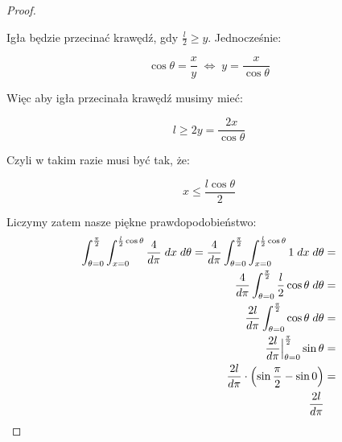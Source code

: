 \begin{proof}
\begin{center}
    \end{center}
    
    Igła będzie przecinać krawędź, gdy \( \frac{l}{2} \geq y\). Jednocześnie:
    
    \[
        \cos{\theta} = \frac{x}{y} \; \iff \; y = \frac{x}{\cos{\theta}} 
    \]
    
    Więc aby igła przecinała krawędź musimy mieć: 
    
    \[ 
        l \geq 2y = \frac{2x}{\cos{\theta}}
    \]
    
    Czyli w takim razie musi być tak, że: 
    
    \[ 
        x \leq \frac{l \cos{\theta}}{2}
    \]
    
    Liczymy zatem nasze piękne prawdopodobieństwo:
    \begin{align*}
        \int_{\theta=0}^{\frac{\pi}{2}} \int_{x=0}^{\frac{l}{2}\cos{\theta}} \frac{4}{d\pi} \; dx\; d\theta = \frac{4}{d\pi}  \int_{\theta=0}^{\frac{\pi}{2}} \int_{x=0}^{\frac{l}{2}\cos{\theta}} 1 \; dx \; d\theta &= \\
        \frac{4}{d\pi}  \int_{\theta=0}^{\frac{\pi}{2}} \frac{l}{2} \cos{\theta} \; d\theta &= \\ 
        \frac{2l}{d\pi}  \int_{\theta=0}^{\frac{\pi}{2}} \cos{\theta} \; d\theta &= \\ 
         \frac{2l}{d\pi} \Big\rvert_{\theta=0}^{\frac{\pi}{2}} \sin{\theta} &= \\
         \frac{2l}{d\pi} \cdot \left(\sin{\frac{\pi}{2}} - \sin{0}\right) &= \\ 
         \frac{2l}{d\pi}
    \end{align*}
\end{proof}
